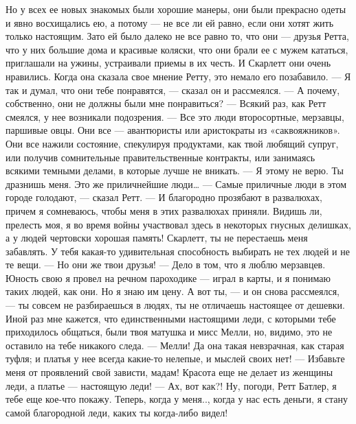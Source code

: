 Но у всех ее новых знакомых были хорошие манеры, они были прекрасно одеты и явно восхищались ею, а потому — не все ли ей равно, если они хотят жить только настоящим. Зато ей было далеко не все равно то, что они — друзья Ретта, что у них большие дома и красивые коляски, что они брали ее с мужем кататься, приглашали на ужины, устраивали приемы в их честь. И Скарлетт они очень нравились. Когда она сказала свое мнение Ретту, это немало его позабавило.
— Я так и думал, что они тебе понравятся, — сказал он и рассмеялся.
— А почему, собственно, они не должны были мне понравиться? — Всякий раз, как Ретт смеялся, у нее возникали подозрения.
— Все это люди второсортные, мерзавцы, паршивые овцы. Они все — авантюристы или аристократы из «саквояжников». Они все нажили состояние, спекулируя продуктами, как твой любящий супруг, или получив сомнительные правительственные контракты, или занимаясь всякими темными делами, в которые лучше не вникать.
— Я этому не верю. Ты дразнишь меня. Это же приличнейшие люди…
— Самые приличные люди в этом городе голодают, — сказал Ретт. — И благородно прозябают в развалюхах, причем я сомневаюсь, чтобы меня в этих развалюхах приняли. Видишь ли, прелесть моя, я во время войны участвовал здесь в некоторых гнусных делишках, а у людей чертовски хорошая память! Скарлетт, ты не перестаешь меня забавлять. У тебя какая-то удивительная способность выбирать не тех людей и не те вещи.
— Но они же твои друзья!
— Дело в том, что я люблю мерзавцев. Юность свою я провел на речном пароходике — играл в карты, и я понимаю таких людей, как они. Но я знаю им цену. А вот ты, — и он снова рассмеялся, — ты совсем не разбираешься в людях, ты не отличаешь настоящее от дешевки. Иной раз мне кажется, что единственными настоящими леди, с которыми тебе приходилось общаться, были твоя матушка и мисс Мелли, но, видимо, это не оставило на тебе никакого следа.
— Мелли! Да она такая невзрачная, как старая туфля; и платья у нее всегда какие-то нелепые, и мыслей своих нет!
— Избавьте меня от проявлений свой зависти, мадам! Красота еще не делает из женщины леди, а платье — настоящую леди!
— Ах, вот как?! Ну, погоди, Ретт Батлер, я тебе еще кое-что покажу. Теперь, когда у меня.., когда у нас есть деньги, я стану самой благородной леди, каких ты когда-либо видел!
